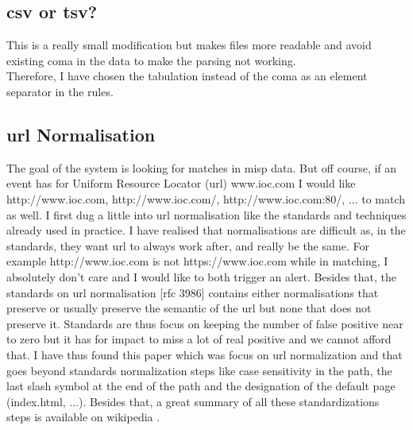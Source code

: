 \documentclass{eplmastersthesis}
\begin{document}
\subsection{\gls{csv} or \gls{tsv}?}
This is a really small modification but makes files more readable and avoid existing coma in the data to make the parsing not working.\\
Therefore, I have chosen the tabulation instead of the coma as an element separator in the rules.

\subsection{\gls{url} Normalisation}
The goal of the system is looking for matches in \gls{misp} data. But off course, if an event has for Uniform Resource Locator (\gls{url}) www.ioc.com I would like http://www.ioc.com, http://www.ioc.com/, http://www.ioc.com:80/, ... to match as well.
I first dug a little into \gls{url} normalisation like the standards and techniques already used in practice. I have realised that normalisations are difficult as, in the standards, they want \gls{url} to always work after, and really be the same. For example http://www.ioc.com is not https://www.ioc.com while in matching, I absolutely don't care and I would like to both trigger an alert.
Besides that, the standards on \gls{url} normalisation [\gls{rfc} 3986] contains either normalisations that preserve or usually preserve the semantic of the \gls{url} but none that does not preserve it.
Standards are thus focus on keeping the number of false positive near to zero but it has for impact to miss a lot of real positive and we cannot afford that.
I have thus found this paper \cite{lee2005url} which was focus on \gls{url} normalization and that goes beyond standards normalization steps like case sensitivity in the path, the last slash symbol at the end of the path and the designation of the default page (index.html, ...).
Besides that, a great summary of all these standardizations steps is available on wikipedia \cite{wikiNormalizationURL}.\\
\end{document}
